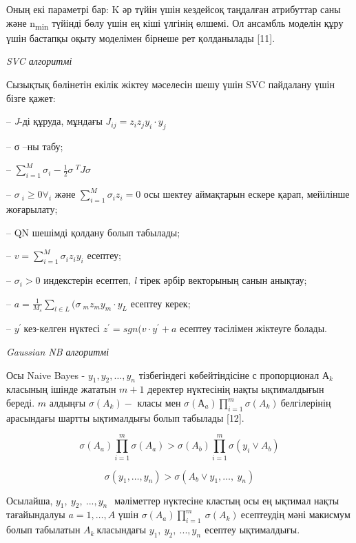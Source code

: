 \begin{multicols}{2}
Оның екі параметрі бар: K әр түйін үшін кездейсоқ таңдалған атрибуттар
саны және n\textsubscript{min} түйінді бөлу үшін ең кіші үлгінің өлшемі.
Ол ансамбль моделін құру үшін бастапқы оқыту моделімен бірнеше рет
қолданылады {[}11{]}.

\emph{SVC алгоритмі}

Сызықтық бөлінетін екілік жіктеу мәселесін шешу үшін SVC пайдалану үшін
бізге қажет:

-- \emph{J}-ді құруда, мұндағы
\(J_{ij} = z_{i}z_{j}y_{i} \cdot y_{j}\)

-- σ --ны табу;

-- \(\sum_{i = 1}^{M}{}{\sigma}_{i} - \frac{1}{2}{\sigma\ }^{T}J\sigma\ \)

-- \({\sigma\ }_{i} \geq 0 \forall_{i} \text{ және }\sum_{i = 1}^{M}{}{\sigma}_{i}z_{i} = 0\) осы
шектеу аймақтарын ескере қарап, мейілінше жоғарылату;

-- QN шешімді қолдану болып табылады;

-- \(v = \sum_{i = 1}^{M}{}{\sigma}_{i}z_{i}y_{i}\) есептеу;

-- \({\sigma}_{i} > 0\) индекстерін есептеп, \emph{l} тірек
әрбір векторының санын анықтау;

-- \(a = \frac{1}{M_{s}}\sum_{l \in L}^{}{}({\sigma\ }_{m}z_{m}y_{m} \cdot y_{L}\)
есептеу керек;

-- \(y^{'}\ \)кез-келген нүктесі \(z^{'} = sgn(v \cdot y^{'} + a\)
есептеу тәсілімен жіктеуге болады.

\emph{Gaussian NB алгоритмі}

Осы Naive Bayes - \(y_{1}, y_{2}, \ldots, y_{n}\) тізбегіндегі
көбейтіндісіне с пропорционал \(А_{k}\)класының ішінде жататын
\(m + 1\) деректер нүктесінің нақты ықтималдығын береді. \(m\)
алдыңғы \(\sigma\left( A_{k} \right) -\) класы мен
\(\sigma\left( А_{a} \right)\prod_{i = 1}^{m}{}\sigma\left( A_{k} \right)\ \)белгілерінің
арасындағы шартты ықтималдығы болып табылады {[}12{]}.

\[\sigma(A_{a})\prod_{i = 1}^{m}{}\sigma\left( A_{a} \right) > \sigma(A_{b})\prod_{i = 1}^{m}{}\sigma(y_{i}\vee A_{b})\]

\[\sigma\left( y_{1},\ldots,y_{n} \right) > \sigma(A_{b}\vee y_{1},\ldots,\ y_{n})\]

Осылайша, \(y_{1},\ y_{2},\ ...,y_{n\ }\ \) мәліметтер нүктесіне кластың
осы ең ықтимал нақты тағайындалуы \(a = 1,\ldots,A\) үшін
\(\sigma\left( A_{a} \right)\prod_{i = 1}^{m}{}\ \sigma\left( A_{k} \right)\ \)есептеудің
мәні макисмум болып табылатын \(A_{k}\ \)класындағы
\(y_{1},\ y_{2},\ ...,y_{n\ }\ \)есептеу ықтималдығы.


\end{multicols}
